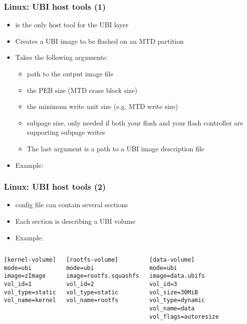 \begin{frame}
  \frametitle{Linux: UBI host tools (1)}
  \begin{itemize}
  \item {} is the only host tool for the UBI layer
  \item Creates a UBI image to be flashed on an MTD partition
  \item Takes the following arguments:
    \begin{itemize}
    \item {} path to the output image file
    \item {} the PEB size (MTD erase block size)
    \item {} the minimum write unit size (e.g.
      MTD write size)
    \item {} subpage size, only needed if both
      your flash and your flash controller are supporting subpage
      writes
    \item The last argument is a path to a UBI image description file
    \end{itemize}
  \item Example: 
  \end{itemize}
\end{frame}

\begin{frame}[fragile]
  \frametitle{Linux: UBI host tools (2)}
  \begin{itemize}
  \item {} config file can contain several sections
  \item Each section is describing a UBI volume
  \item Example:
  \end{itemize}
  \begin{columns}
\small
\begin{verbatim}
[kernel-volume]
mode=ubi
image=zImage
vol_id=1
vol_type=static
vol_name=kernel
\end{verbatim}
\small
\begin{verbatim}
[rootfs-volume]
mode=ubi
image=rootfs.squashfs
vol_id=2
vol_type=static
vol_name=rootfs
\end{verbatim}
\small
\begin{verbatim}
[data-volume]
mode=ubi
image=data.ubifs
vol_id=3
vol_size=30MiB
vol_type=dynamic
vol_name=data
vol_flags=autoresize
\end{verbatim}
  \end{columns}
\end{frame}

